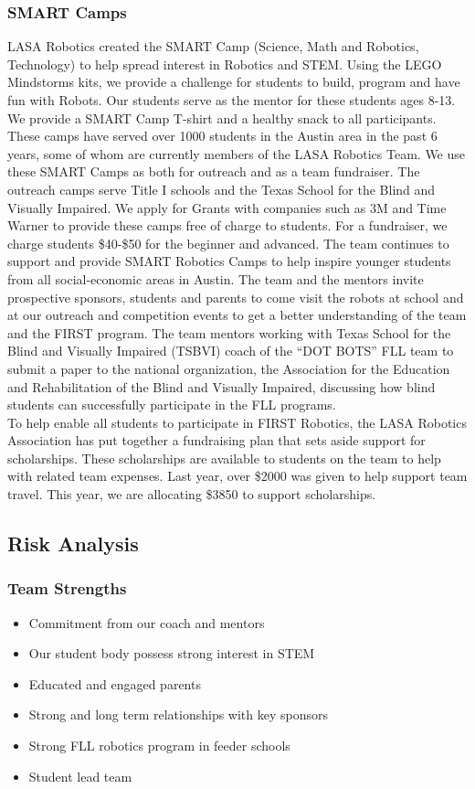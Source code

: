 \subsubsection{SMART Camps}
LASA Robotics created the SMART Camp (Science, Math and Robotics, Technology) to help spread interest in Robotics and STEM. Using the LEGO Mindstorms kits, we provide a challenge for students to build, program and have fun with Robots. Our students serve as the mentor for these students ages 8-13. We provide a SMART Camp T-shirt and a healthy snack to all participants. These camps have served over 1000 students in the Austin area in the past 6 years, some of whom are currently members of the LASA Robotics Team. We use these SMART Camps as both for outreach and as a team fundraiser.   The outreach camps serve Title I schools and the Texas School for the Blind and Visually Impaired. We apply for Grants with companies such as 3M and Time Warner to provide these camps free of charge to students. For a fundraiser, we charge students \$40-\$50 for the beginner and advanced. The team continues to support and provide SMART Robotics Camps to help inspire younger students from all social-economic areas in Austin. The team and the mentors invite prospective sponsors, students and parents to come visit the robots at school and at our outreach and competition events to get a better understanding of the team and the FIRST program. The team mentors working with Texas School for the Blind and Visually Impaired (TSBVI) coach of the “DOT BOTS” FLL team to submit a paper to the national organization, the Association for the Education and Rehabilitation of the Blind and Visually Impaired, discussing how blind students can successfully participate in the FLL programs.\\

To help enable all students to participate in FIRST Robotics, the LASA Robotics Association has put together a fundraising plan that sets aside support for scholarships. These scholarships are available to students on the team to help with related team expenses. Last year, over \$2000 was given to help support team travel. This year, we are allocating \$3850 to support scholarships.

\clearpage
\newpage

\subsection{Risk Analysis}
\subsubsection{Team Strengths}
\begin{itemize}
	\item Commitment from our coach and mentors
	\item Our student body possess strong interest in STEM
	\item Educated and engaged parents
	\item Strong and long term relationships with key sponsors
	\item Strong FLL robotics program in feeder schools
	\item Student lead team
\end{itemize}

